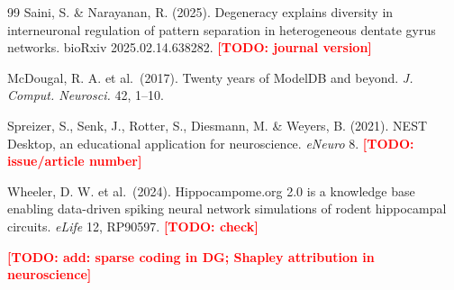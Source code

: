 \documentclass[11pt,a4paper]{article}
\newcommand{\todo}[1]{\textcolor{red}{\textbf{[TODO: #1]}}}
\begin{document}
\begin{thebibliography}{99}
 Saini, S. \& Narayanan, R. (2025). Degeneracy explains
diversity in interneuronal regulation of pattern separation in heterogeneous
dentate gyrus networks. bioRxiv 2025.02.14.638282. \todo{journal version}

 McDougal, R. A. et al.\ (2017). Twenty years of ModelDB
and beyond. \emph{J. Comput. Neurosci.} 42, 1--10.

 Spreizer, S., Senk, J., Rotter, S., Diesmann, M. \&
Weyers, B. (2021). NEST Desktop, an educational application for neuroscience.
\emph{eNeuro} 8. \todo{issue/article number}

 Wheeler, D. W. et al.\ (2024). Hippocampome.org 2.0 is a
knowledge base enabling data-driven spiking neural network simulations of rodent
hippocampal circuits. \emph{eLife} 12, RP90597. \todo{check}

\todo{add: sparse coding in DG; Shapley attribution in neuroscience}
\end{thebibliography}
\end{document}
